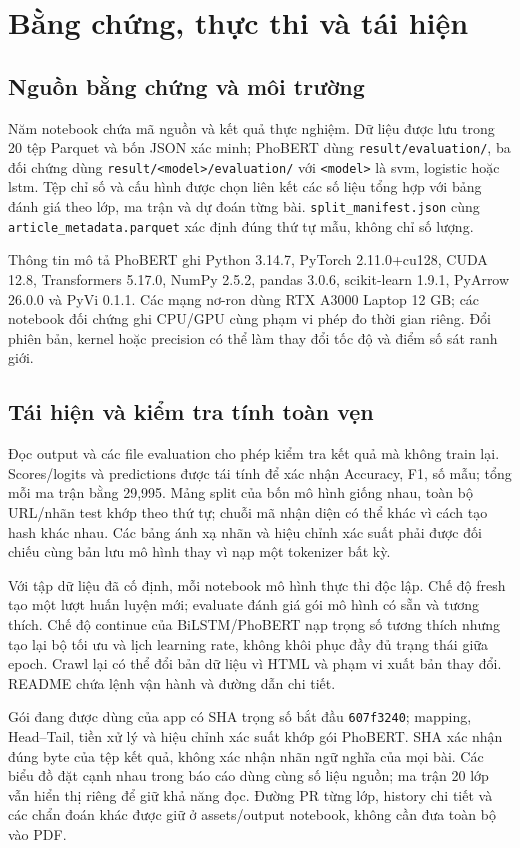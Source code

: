 \chapter{Bằng chứng, thực thi và tái hiện}\label{app:evidence}
\section{Nguồn bằng chứng và môi trường}
Năm notebook chứa mã nguồn và kết quả thực nghiệm. Dữ liệu được lưu trong 20 tệp Parquet và bốn JSON xác minh; PhoBERT dùng \texttt{result/evaluation/}, ba đối chứng dùng \texttt{result/<model>/evaluation/} với \texttt{<model>} là svm, logistic hoặc lstm. Tệp chỉ số và cấu hình được chọn liên kết các số liệu tổng hợp với bảng đánh giá theo lớp, ma trận và dự đoán từng bài. \texttt{split\_manifest.json} cùng \texttt{article\_metadata.parquet} xác định đúng thứ tự mẫu, không chỉ số lượng.

Thông tin mô tả PhoBERT ghi Python 3.14.7, PyTorch 2.11.0+cu128, CUDA 12.8, Transformers 5.17.0, NumPy 2.5.2, pandas 3.0.6, scikit-learn 1.9.1, PyArrow 26.0.0 và PyVi 0.1.1. Các mạng nơ-ron dùng RTX A3000 Laptop 12 GB; các notebook đối chứng ghi CPU/GPU cùng phạm vi phép đo thời gian riêng. Đổi phiên bản, kernel hoặc precision có thể làm thay đổi tốc độ và điểm số sát ranh giới.

\section{Tái hiện và kiểm tra tính toàn vẹn}
Đọc output và các file evaluation cho phép kiểm tra kết quả mà không train lại. Scores/logits và predictions được tái tính để xác nhận Accuracy, F1, số mẫu; tổng mỗi ma trận bằng 29,995. Mảng split của bốn mô hình giống nhau, toàn bộ URL/nhãn test khớp theo thứ tự; chuỗi mã nhận diện có thể khác vì cách tạo hash khác nhau. Các bảng ánh xạ nhãn và hiệu chỉnh xác suất phải được đối chiếu cùng bản lưu mô hình thay vì nạp một tokenizer bất kỳ.

Với tập dữ liệu đã cố định, mỗi notebook mô hình thực thi độc lập. Chế độ fresh tạo một lượt huấn luyện mới; evaluate đánh giá gói mô hình có sẵn và tương thích. Chế độ continue của BiLSTM/PhoBERT nạp trọng số tương thích nhưng tạo lại bộ tối ưu và lịch learning rate, không khôi phục đầy đủ trạng thái giữa epoch. Crawl lại có thể đổi bản dữ liệu vì HTML và phạm vi xuất bản thay đổi. README chứa lệnh vận hành và đường dẫn chi tiết.

Gói đang được dùng của app có SHA trọng số bắt đầu \texttt{607f3240}; mapping, Head--Tail, tiền xử lý và hiệu chỉnh xác suất khớp gói PhoBERT. SHA xác nhận đúng byte của tệp kết quả, không xác nhận nhãn ngữ nghĩa của mọi bài. Các biểu đồ đặt cạnh nhau trong báo cáo dùng cùng số liệu nguồn; ma trận 20 lớp vẫn hiển thị riêng để giữ khả năng đọc. Đường PR từng lớp, history chi tiết và các chẩn đoán khác được giữ ở assets/output notebook, không cần đưa toàn bộ vào PDF.
\clearpage

